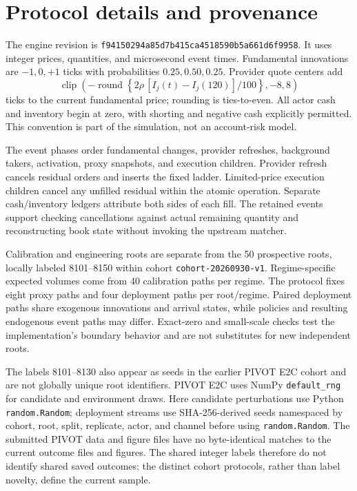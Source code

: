 \documentclass[10pt,letterpaper]{article}
\begin{document}
\section{Protocol details and provenance}\label{app:protocol}
The engine revision is \texttt{f94150294a85d7b415ca4518590b5a661d6f9958}. It uses integer prices, quantities, and microsecond event times. Fundamental innovations are $-1,0,+1$ ticks with probabilities $0.25,0.50,0.25$. Provider quote centers add
\[
\operatorname{clip}\!\left(-\operatorname{round}\left\{2\rho\,[I_j(t)-I_j(120)]/100\right\},-8,8\right)
\]
ticks to the current fundamental price; rounding is ties-to-even. All actor cash and inventory begin at zero, with shorting and negative cash explicitly permitted. This convention is part of the simulation, not an account-risk model.

The event phases order fundamental changes, provider refreshes, background takers, activation, proxy snapshots, and execution children. Provider refresh cancels residual orders and inserts the fixed ladder. Limited-price execution children cancel any unfilled residual within the atomic operation. Separate cash/inventory ledgers attribute both sides of each fill. The retained events support checking cancellations against actual remaining quantity and reconstructing book state without invoking the upstream matcher.

Calibration and engineering roots are separate from the 50 prospective roots, locally labeled 8101--8150 within cohort \texttt{cohort-20260930-v1}. Regime-specific expected volumes come from 40 calibration paths per regime. The protocol fixes eight proxy paths and four deployment paths per root/regime. Paired deployment paths share exogenous innovations and arrival states, while policies and resulting endogenous event paths may differ. Exact-zero and small-scale checks test the implementation's boundary behavior and are not substitutes for new independent roots.

The labels 8101--8130 also appear as seeds in the earlier PIVOT E2C cohort and are not globally unique root identifiers. PIVOT E2C uses NumPy \texttt{default\_rng} for candidate and environment draws. Here candidate perturbations use Python \texttt{random.Random}; deployment streams use SHA-256-derived seeds namespaced by cohort, root, split, replicate, actor, and channel before using \texttt{random.Random}. The submitted PIVOT data and figure files have no byte-identical matches to the current outcome files and figures. The shared integer labels therefore do not identify shared saved outcomes; the distinct cohort protocols, rather than label novelty, define the current sample.
\end{document}
